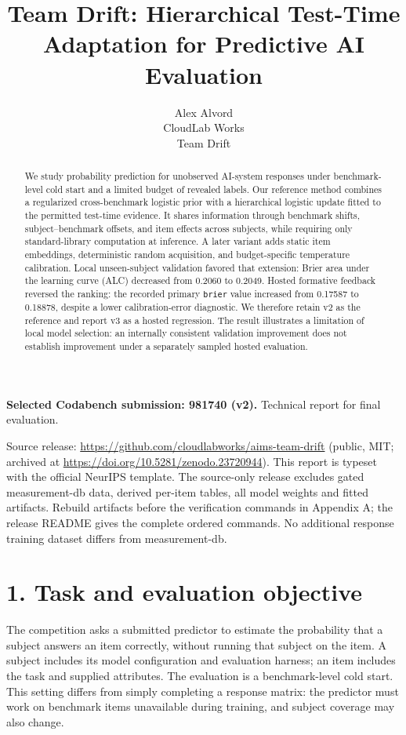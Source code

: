 \documentclass{article}
\title{Team Drift: Hierarchical Test-Time Adaptation for Predictive AI Evaluation}
\author{Alex Alvord\\CloudLab Works\\Team Drift}
\providecommand{\passthrough}[1]{#1}
\begin{document}
\maketitle
\begin{abstract}
We study probability prediction for unobserved AI-system responses under benchmark-level cold start and a limited budget of revealed labels. Our reference method combines a regularized cross-benchmark logistic prior with a hierarchical logistic update fitted to the permitted test-time evidence. It shares information through benchmark shifts, subject--benchmark offsets, and item effects across subjects, while requiring only standard-library computation at inference. A later variant adds static item embeddings, deterministic random acquisition, and budget-specific temperature calibration. Local unseen-subject validation favored that extension: Brier area under the learning curve (ALC) decreased from 0.2060 to 0.2049. Hosted formative feedback reversed the ranking: the recorded primary \passthrough{\lstinline!brier!} value increased from 0.17587 to 0.18878, despite a lower calibration-error diagnostic. We therefore retain v2 as the reference and report v3 as a hosted regression. The result illustrates a limitation of local model selection: an internally consistent validation improvement does not establish improvement under a separately sampled hosted evaluation.
\end{abstract}
\noindent\textbf{Selected Codabench submission: 981740 (v2).} Technical report for final evaluation.

Source release: \url{https://github.com/cloudlabworks/aims-team-drift} (public, MIT; archived at \url{https://doi.org/10.5281/zenodo.23720944}). This report is typeset with the official NeurIPS template. The source-only release excludes gated measurement-db data, derived per-item tables, all model weights and fitted artifacts. Rebuild artifacts before the verification commands in Appendix A; the release README gives the complete ordered commands. No additional response training dataset differs from measurement-db.
\section{1. Task and evaluation objective}\label{task-and-evaluation-objective}

The competition asks a submitted predictor to estimate the probability that a subject answers an item correctly, without running that subject on the item. A subject includes its model configuration and evaluation harness; an item includes the task and supplied attributes. The evaluation is a benchmark-level cold start. This setting differs from simply completing a response matrix: the predictor must work on benchmark items unavailable during training, and subject coverage may also change.
\end{document}
